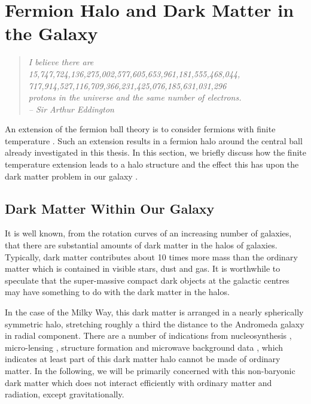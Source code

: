\section{Fermion Halo and Dark Matter in the Galaxy}
\begin{quotation}
	\raggedleft \it I believe there are
	15,747,724,136,275,002,577,605,653,961,181,555,468,044,\\
	717,914,527,116,709,366,231,425,076,185,631,031,296 \\
	protons in the universe and the same number of electrons.\\
	-- Sir Arthur Eddington
\end{quotation}
An extension of the fermion ball theory is to consider fermions with finite temperature \cite{ref_finitetemp}.
Such an extension results in a fermion halo around
the central ball already investigated in this thesis. In this section, we briefly discuss how the finite temperature extension leads to a
halo structure and the effect this has upon the dark matter problem in our galaxy \cite{ref_halo}.

\subsection{Dark Matter Within Our Galaxy}
It is well known, from the rotation curves of an increasing number of galaxies, that there are substantial amounts of dark matter in the halos
of galaxies. Typically, dark matter contributes about 10 times more mass than the ordinary matter which is contained in visible stars, dust
and gas. It is worthwhile to speculate that the super-massive compact dark objects at the galactic centres may have something to do with the
dark matter in the halos.

In the case of the Milky Way, this dark matter is arranged in a nearly spherically symmetric halo, stretching roughly a third the distance to
the Andromeda galaxy in radial component. There are a number of indications from nucleosynthesis \cite{ref_halonucleo},
micro-lensing \cite{ref_halomicrolens}, structure formation and microwave background data \cite{ref_halocmbstruct},
which indicates at least part of this dark matter halo cannot be made of ordinary matter. In the following, we will be primarily
concerned with this non-baryonic dark matter which does not interact efficiently with ordinary matter and radiation, except gravitationally.

